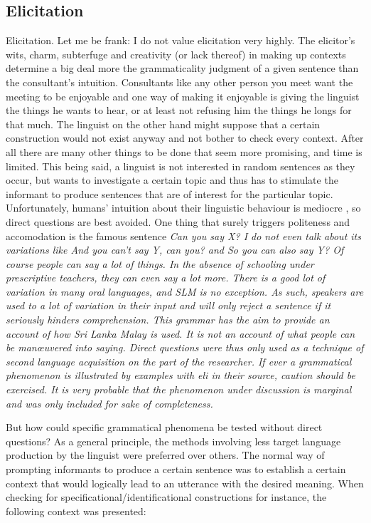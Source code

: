\subsection{Elicitation}
Elicitation. Let me be frank: I do not value elicitation very highly. The elicitor's wits, charm, subterfuge and creativity (or lack thereof) in making up contexts  determine a big deal more the grammaticality judgment of a given sentence than the consultant's intuition. Consultants like any other person you meet want the meeting to be enjoyable and one way of making it enjoyable is giving the linguist the things he wants to hear, or at least not refusing him the things he longs for that much. 
The linguist on the other hand might suppose that a certain construction would not exist anyway and not bother to check every context. After all there are many other things to be done that seem more promising, and time is limited.
This being said, a linguist is not interested in random sentences as they occur, but wants to investigate a certain topic and thus has to stimulate the informant to produce sentences that are of interest for the particular topic. Unfortunately, humans' intuition about their linguistic behaviour is mediocre \citep{Labov1975fact, datengwm}, so direct questions are best avoided.
One thing that surely triggers politeness and accomodation is the famous sentence \em Can you say X? \em I do not even talk about its variations like \em And you can't say Y, can you? \em and \em So you can also say Y? \em Of course people \em can \em say a lot of things. In the absence of schooling under prescriptive teachers, they can even say a lot more. There is a good lot of variation in many oral languages, and SLM is no exception. As such, speakers are used to a lot of variation in their input and will only reject a sentence if it seriously hinders comprehension. This grammar has the aim to provide an account of how Sri Lanka Malay is used. It is not an account of what people can be man\oe uvered into saying. Direct questions were thus only used as a technique of second language acquisition on the part of the researcher. If ever a grammatical phenomenon is illustrated by examples with \em eli \em in their source, caution should be exercised. It is very probable that the phenomenon under discussion is marginal and was only included for sake of completeness.

But how could specific grammatical phenomena be tested without direct questions? As a general principle, the methods involving less target language production by the linguist were preferred over others. The normal way of prompting informants to produce a certain sentence was to establish a certain context that would logically lead to an utterance with the desired meaning. When checking for specificational/identificational constructions for instance, the following context was presented: 

